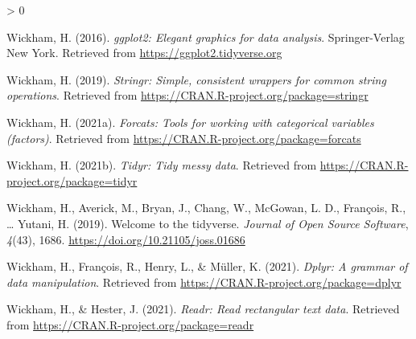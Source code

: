\documentclass[
  english,
  man]{apa6}
\newlength{\cslhangindent}
\newenvironment{CSLReferences}[2] %
 {%
  \setlength{\parindent}{0pt}
  \ifodd #1 \everypar{\setlength{\hangindent}{\cslhangindent}}\ignorespaces\fi
  \ifnum #2 > 0
  \setlength{\parskip}{#2\baselineskip}
  \fi
 }%
 {}
\begin{document}
\begin{CSLReferences}{1}{0}
\leavevmode\hypertarget{ref-R-ggplot2}{}%
Wickham, H. (2016). \emph{ggplot2: Elegant graphics for data analysis}. Springer-Verlag New York. Retrieved from \url{https://ggplot2.tidyverse.org}

\leavevmode\hypertarget{ref-R-stringr}{}%
Wickham, H. (2019). \emph{Stringr: Simple, consistent wrappers for common string operations}. Retrieved from \url{https://CRAN.R-project.org/package=stringr}

\leavevmode\hypertarget{ref-R-forcats}{}%
Wickham, H. (2021a). \emph{Forcats: Tools for working with categorical variables (factors)}. Retrieved from \url{https://CRAN.R-project.org/package=forcats}

\leavevmode\hypertarget{ref-R-tidyr}{}%
Wickham, H. (2021b). \emph{Tidyr: Tidy messy data}. Retrieved from \url{https://CRAN.R-project.org/package=tidyr}

\leavevmode\hypertarget{ref-R-tidyverse}{}%
Wickham, H., Averick, M., Bryan, J., Chang, W., McGowan, L. D., François, R., \ldots{} Yutani, H. (2019). Welcome to the {tidyverse}. \emph{Journal of Open Source Software}, \emph{4}(43), 1686. \url{https://doi.org/10.21105/joss.01686}

\leavevmode\hypertarget{ref-R-dplyr}{}%
Wickham, H., François, R., Henry, L., \& Müller, K. (2021). \emph{Dplyr: A grammar of data manipulation}. Retrieved from \url{https://CRAN.R-project.org/package=dplyr}

\leavevmode\hypertarget{ref-R-readr}{}%
Wickham, H., \& Hester, J. (2021). \emph{Readr: Read rectangular text data}. Retrieved from \url{https://CRAN.R-project.org/package=readr}

\end{CSLReferences}

\endgroup
\end{document}
